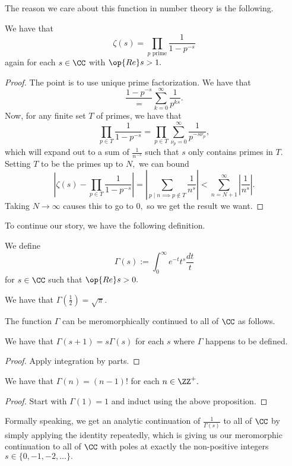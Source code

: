 \documentclass[../notes.tex]{subfiles}
\begin{document}
The reason we care about this function in number theory is the following.
\begin{proposition}
	We have that
	\[\zeta(s)=\prod_{p\text{ prime}}\frac1{1-p^{-s}}\]
	again for each $s\in\CC$ with $\op{Re}s>1.$
\end{proposition}
\begin{proof}
	The point is to use unique prime factorization. We have that
	\[\frac{1-p^{-s}}=\sum_{k=0}^\infty\frac1{p^{ks}}.\]
	Now, for any finite set $T$ of primes, we have that
	\[\prod_{p\in T}\frac1{1-p^{-s}}=\prod_{p\in T}\sum_{\nu_p=0}^\infty\frac1{p^{-s\nu_p}},\]
	which will expand out to a sum of $\frac1{n^{-s}}$ such that $s$ only contains primes in $T.$ Setting $T$ to be the primes up to $N,$ we can bound
	\[\left|\zeta(s)-\prod_{p\in T}\frac1{1-p^{-s}}\right|=\left|\sum_{p\mid n\implies p\notin T}\frac1{n^s}\right|<\sum_{n=N+1}^\infty\left|\frac1{n^s}\right|.\]
	Taking $N\to\infty$ causes this to go to $0,$ so we get the result we want.
\end{proof}
To continue our story, we have the following definition.
\begin{definition}
	We define
	\[\Gamma(s):=\int_0^\infty e^{-t}t^s\frac{dt}t\]
	for $s\in\CC$ such that $\op{Re}s>0.$
\end{definition}
\begin{example}
	We have that $\Gamma\left(\frac12\right)=\sqrt\pi.$
\end{example}
The function $\Gamma$ can be meromorphically continued to all of $\CC$ as follows.
\begin{proposition}
	We have that $\Gamma(s+1)=s\Gamma(s)$ for each $s$ where $\Gamma$ happens to be defined.
\end{proposition}
\begin{proof}
	Apply integration by parts.
\end{proof}
\begin{corollary}
	We have that $\Gamma(n)=(n-1)!$ for each $n\in\ZZ^+.$
\end{corollary}
\begin{proof}
	Start with $\Gamma(1)=1$ and induct using the above proposition.
\end{proof}
Formally speaking, we get an analytic continuation of $\frac1{\Gamma(s)}$ to all of $\CC$ by simply applying the identity repeatedly, which is giving us our meromorphic continuation to all of $\CC$ with poles at exactly the non-positive integers $s\in\{0,-1,-2,\ldots\}.$
\end{document}
